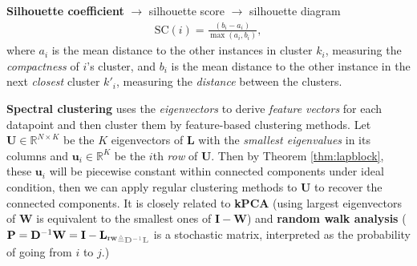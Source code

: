 \textbf{Silhouette coefficient} $\to$ silhouette score $\to$ silhouette diagram
\begin{gather}
    \mathrm{SC}(i) = \frac{(b_i-a_i)}{\max(a_i,b_i)},
\end{gather}
where $a_i$ is the mean distance to the other instances in cluster $k_i$, measuring the \textit{compactness} of $i$'s cluster,
and $b_i$ is the mean distance to the other instance in the next \textit{closest} cluster $k'_i$, measuring the \textit{distance} between the clusters.

\textbf{Spectral clustering} uses the \textit{eigenvectors} to derive \textit{feature vectors} for each datapoint 
and then cluster them by feature-based clustering methods.
Let $\mathbf{U}\in\mathbb{R}^{N\times K}$ be the $K$ eigenvectors of $\mathbf{L}$ with the \textit{smallest eigenvalues} in its columns
and $\bm{u}_i\in\mathbb{R}^K$ be the $i$th \textit{row} of $\mathbf{U}$.
Then by Theorem \ref{thm:lapblock}, these $\bm{u}_i$ will be piecewise constant within connected components under ideal condition,
then we can apply regular clustering methods to $\mathbf{U}$ to recover the connected components.
It is closely related to \textbf{kPCA} (using largest eigenvectors of $\mathbf{W}$ is equivalent to the smallest ones of $\mathbf{I}-\mathbf{W}$) and 
\textbf{random walk analysis} ($\mathbf{P}=\mathbf{D}^{-1}\mathbf{W}=\mathbf{I}-{\mathbf{L}_\text{rw}}_{\color{gray}\triangleq \mathbf{D}^{-1}\mathbf{L}}$
is a stochastic matrix, interpreted as the probability of going from $i$ to $j$.)

